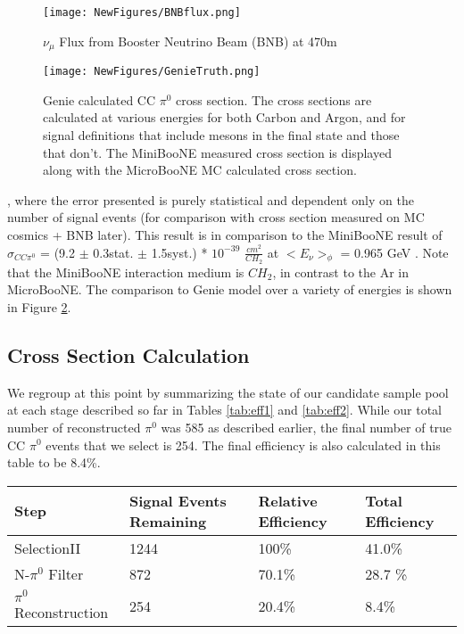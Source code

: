 \documentclass[12pt]{article}
\begin{document}
\begin{figure}[h!]
\centering
\texttt{[image: NewFigures/BNBflux.png]}
\caption{$\nu_\mu$ Flux from Booster Neutrino Beam (BNB) at 470m }
\label{fig:flux}
\end{figure}

\begin{figure}[h!]
\centering
\texttt{[image: NewFigures/GenieTruth.png]}
\caption{Genie calculated CC $\pi^0$ cross section. The cross sections are calculated at various energies for both Carbon and Argon, and for signal definitions that include mesons in the final state and those that don't. The MiniBooNE measured cross section is displayed along with the MicroBooNE MC calculated cross section. }
\label{fig:genietruth}
\end{figure}

, where the error presented is purely statistical and dependent only on the number of signal events (for comparison with cross section measured on MC cosmics + BNB later).  This result is in comparison to the MiniBooNE result of $\sigma_{CC\pi^0}$ = (9.2 $\pm$ 0.3stat. $\pm$ 1.5syst.) * $10^{-39}$ $\frac{cm^2}{CH_2}$ at $<E_\nu>_\phi$ = 0.965 GeV \cite{bib:numucc_miniboone}.  Note that the MiniBooNE interaction medium is $CH_2$, in contrast to the Ar in MicroBooNE. The comparison to Genie model over a variety of energies is shown in Figure \ref{fig:genietruth}.

\subsection{Cross Section Calculation}

We regroup at this point by summarizing the state of our candidate sample pool at each stage described so far in Tables \ref{tab:eff1} and \ref{tab:eff2}. While our total number of reconstructed $\pi^0$ was 585 as described earlier, the final number of true CC $\pi^0$ events that we select is 254. The final efficiency is also calculated in this table to be 8.4\%.  

\begin{minipage}{\linewidth}
\centering
{} \label{tab:eff1} 
 \begin{tabular}{| l | l | l | l |}
 \hline
 Step & Signal Events Remaining & Relative Efficiency & Total Efficiency \\ [0.5ex]
 \hline\hline

\hline
  SelectionII & 1244 & 100\% & 41.0\% \\ 
\hline
  N-$\pi^0$ Filter & 872 & 70.1\% & 28.7 \% \\ \hline
  $\pi^0$ Reconstruction & 254 & 20.4\% & 8.4\% \\ \hline
   \end{tabular}
\end{minipage}
\end{document}
